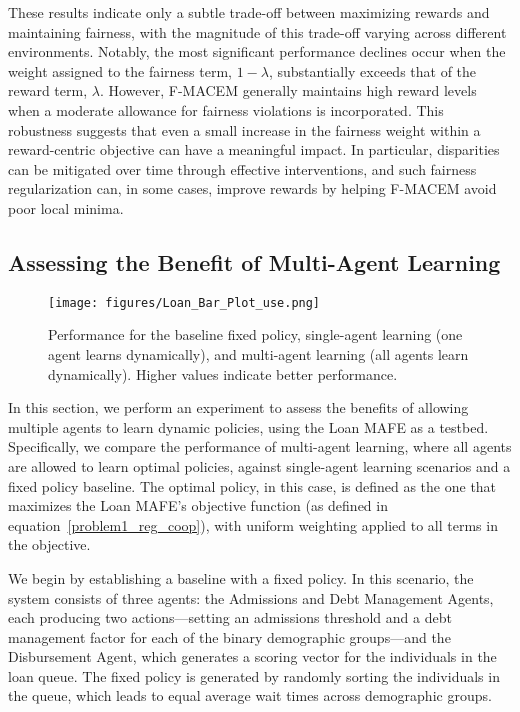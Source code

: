 These results indicate only a subtle trade-off between maximizing rewards and maintaining fairness, with the magnitude of this trade-off varying across different environments. Notably, the most significant performance declines occur when the weight assigned to the fairness term, $1-\lambda$, substantially exceeds that of the reward term, $\lambda$. However, F-MACEM generally maintains high reward levels when a moderate allowance for fairness violations is incorporated. This robustness suggests that even a small increase in the fairness weight within a reward-centric objective can have a meaningful impact. In particular, disparities can be mitigated over time through effective interventions, and such fairness regularization can, in some cases, improve rewards by helping F-MACEM avoid poor local minima.

\subsection{Assessing the Benefit of Multi-Agent Learning}
\begin{figure}[t]
    \centering
    \texttt{[image: figures/Loan\_Bar\_Plot\_use.png]}
    \caption{Performance for the baseline fixed policy, single-agent learning (one agent learns dynamically), and multi-agent learning (all agents learn dynamically). Higher values indicate better performance.} 
    \label{fig::Bar_plot}
    \vspace{0mm}
\end{figure}

In this section, we perform an experiment to assess the benefits of allowing multiple agents to learn dynamic policies, using the Loan MAFE as a testbed. Specifically, we compare the performance of multi-agent learning, where all agents are allowed to learn optimal policies, against single-agent learning scenarios and a fixed policy baseline. The optimal policy, in this case, is defined as the one that maximizes the Loan MAFE’s objective function (as defined in equation~\ref{problem1_reg_coop}), with uniform weighting applied to all terms in the objective.

We begin by establishing a baseline with a fixed policy. In this scenario, the system consists of three agents: the Admissions and Debt Management Agents, each producing two actions—setting an admissions threshold and a debt management factor for each of the binary demographic groups—and the Disbursement Agent, which generates a scoring vector for the individuals in the loan queue. The fixed policy is generated by randomly sorting the individuals in the queue, which leads to equal average wait times across demographic groups.

